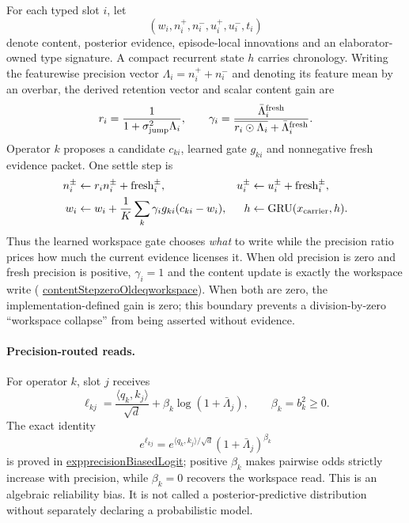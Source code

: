 \documentclass[11pt]{article}
\newcommand{\leanname}[1]{{\scriptsize\ttfamily
  \def\_{\textunderscore\allowbreak}#1}}
\newcommand{\formalcommit}{f3a31db36bb2f944312ee31c1d86c2758109e83a}
\newcommand{\leansource}[3]{%
  \href{https://github.com/zariuq/MeTTapedia/blob/\formalcommit/#1\#L#2}{\leanname{#3}}}
\begin{document}
For each typed slot $i$, let
\[
 (w_i,n_i^+,n_i^-,u_i^+,u_i^-,t_i)
\]
denote content, posterior evidence, episode-local innovations and an
elaborator-owned type signature. A compact recurrent state $h$ carries chronology.
Writing the featurewise precision vector
$\Lambda_i=n_i^++n_i^-$ and denoting its feature mean by an overbar, the
derived retention vector and scalar content gain are
\[
 r_i=\frac{1}{1+\sigma_{\rm jump}^{2}\Lambda_i},
 \qquad
 \gamma_i=\frac{\bar\Lambda_i^{\rm fresh}}
 {\overline{r_i\odot\Lambda_i}+\bar\Lambda_i^{\rm fresh}}.
\]
Operator $k$ proposes a candidate $c_{ki}$, learned gate $g_{ki}$ and nonnegative fresh
evidence packet. One settle step is
\[
\begin{aligned}
n_i^\pm&\leftarrow r_i n_i^\pm+\mathrm{fresh}_i^\pm,&
u_i^\pm&\leftarrow u_i^\pm+\mathrm{fresh}_i^\pm,\\
w_i&\leftarrow w_i+
\frac{1}{K}\sum_k\gamma_i g_{ki}(c_{ki}-w_i),&
h&\leftarrow\operatorname{GRU}(x_{\rm carrier},h).
\end{aligned}
\]
Thus the learned workspace gate chooses \emph{what} to write while the precision ratio
prices how much the current evidence licenses it. When old precision is zero and fresh
precision is positive, $\gamma_i=1$ and the content update is exactly the workspace
write
(\leansource{lean/mettapedia/Mettapedia/MachineLearning/NeuralNetworks/UnifiedCarrier/Core.lean}{114-L131}{contentStep\_zeroOld\_eq\_workspace}).
When both are zero, the implementation-defined gain is zero; this boundary prevents a
division-by-zero ``workspace collapse'' from being asserted without evidence.

\paragraph{Precision-routed reads.}
For operator $k$, slot $j$ receives
\[
 \ell_{kj}=\frac{\langle q_k,k_j\rangle}{\sqrt d}
           +\beta_k\log(1+\bar\Lambda_j),
 \qquad \beta_k=b_k^2\geq0 .
\]
The exact identity
\[
 e^{\ell_{kj}}
 =e^{\langle q_k,k_j\rangle/\sqrt d}(1+\bar\Lambda_j)^{\beta_k}
\]
is proved in
\leansource{lean/mettapedia/Mettapedia/MachineLearning/NeuralNetworks/UnifiedCarrier/Core.lean}{234-L257}{exp\_precisionBiasedLogit};
positive $\beta_k$ makes pairwise odds strictly increase with precision, while
$\beta_k=0$ recovers the workspace read. This is an algebraic reliability bias. It is
not called a posterior-predictive distribution without separately declaring a
probabilistic model.
\end{document}

